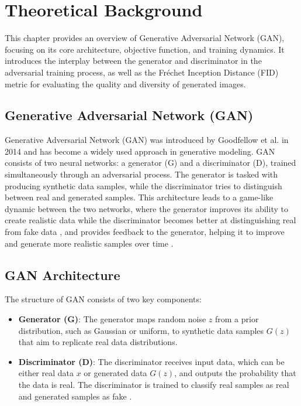 \chapter{Theoretical Background}
\label{Theoretical Background for GAN}
This chapter provides an overview of Generative Adversarial Network (GAN), focusing on its core architecture, objective function, and training dynamics. It introduces the interplay between the generator and discriminator in the adversarial training process, as well as the Fréchet Inception Distance (FID) metric for evaluating the quality and diversity of generated images.



\section{Generative Adversarial Network (GAN)}

Generative Adversarial Network (GAN) was introduced by Goodfellow et al. in 2014 and has become a widely used approach in generative modeling. GAN consists of two neural networks: a generator (G) and a discriminator (D), trained simultaneously through an adversarial process. The generator is tasked with producing synthetic data samples, while the discriminator tries to distinguish between real and generated samples. This architecture leads to a game-like dynamic between the two networks, where the generator improves its ability to create realistic data while the discriminator becomes better at distinguishing real from fake data \citep{10.1109/taslp.2017.2761547}, \citep{10.1007/s10928-021-09787-4} and provides feedback to the generator, helping it to improve and generate more realistic samples over time \citep{10.48550/arxiv.1802.05637}.

\section{GAN Architecture}

The structure of GAN consists of two key components:
\begin{itemize}
    \item \textbf{Generator (G)}: The generator maps random noise \(z\) from a prior distribution, such as Gaussian or uniform, to synthetic data samples \(G(z)\) that aim to replicate real data distributions.
    \item \textbf{Discriminator (D)}: The discriminator receives input data, which can be either real data \(x\) or generated data \(G(z)\), and outputs the probability that the data is real. The discriminator is trained to classify real samples as real and generated samples as fake \citep{10.48550/arxiv.1802.05637}.
\end{itemize}

